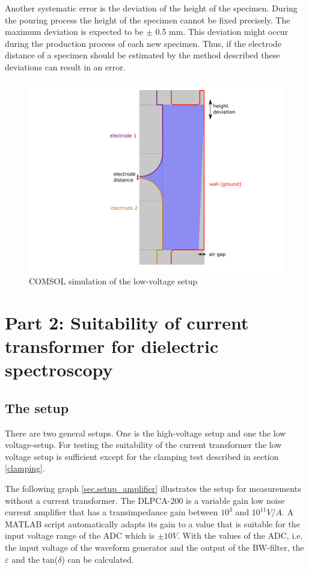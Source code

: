 Another systematic error is the deviation of the height of the specimen. During  the pouring process the height of the specimen cannot be fixed precisely. The maximum deviation is expected to be $\pm$ 0.5 mm. This deviation might occur during the production process of each new specimen. Thus, if the electrode distance of a specimen should be estimated by the method described these deviations can result in an error. 
 \begin{figure}[htbp]
	\centering
	\includegraphics[width=\textwidth]{figures/Method/Part1_d_C0/cell_colour.png}		
	\caption[Kurze Abbildungsbeschreibung]{COMSOL simulation of the low-voltage setup} 
	\label{fig.syserrors}
\end{figure}

\section{Part 2:  Suitability of current transformer for dielectric spectroscopy}
\subsection{The setup}
There are two general setups. One is the high-voltage setup and one the low voltage-setup. For testing the suitability of the current transformer the low voltage setup is sufficient except for the clamping test described in section \ref{clamping}. 

The following graph \ref{sec.setup_amplifier} illustrates the setup for measurements without a current transformer. The DLPCA-200 is a variable gain low noise current amplifier that has a transimpedance gain between $10^3$ and $10^{11} V/A$. A MATLAB script automatically adapts its gain to a value that is suitable for the input voltage range of the ADC which is $\pm 10V$. With the values of the ADC, i.e. the input voltage of the waveform generator and the output of the BW-filter, the $\varepsilon$ and the tan($\delta$) can be calculated. 

